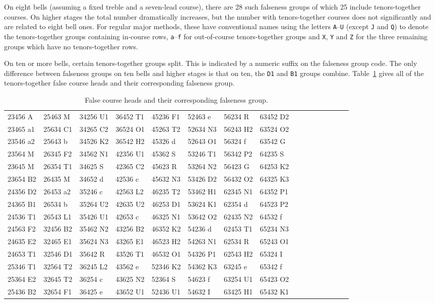 \documentclass[a4paper,11pt,oneside]{book}
\begin{document}
On eight bells (assuming a fixed treble and a seven-lead course), 
there are 28 such falseness groups of which 25 include tenors-together courses.
On higher stages the total number dramatically increases, but the number
with tenors-together courses does not significantly and are related to eight
bell ones.
For regular major methods, these have 
conventional names using the letters \verb+A+--\verb+U+ (except \verb+J+
and \verb+Q+) to denote the tenors-together groups containing in-course rows,
\verb+a+--\verb+f+ for out-of-course 
tenors-together groups and \verb+X+, \verb+Y+ and \verb+Z+ for the three 
remaining groups which have no tenors-together rows.  

On ten or more bells, certain tenors-together groups split.  This is 
indicated by a numeric suffix on the falseness group code.  The only 
difference between falseness groups on ten bells and higher stages is that 
on ten, the \verb+D1+ and \verb+B1+ groups combine.  Table~\ref{tab:fchs}
gives all of the tenors-together false course heads and their corresponding 
falseness group.

\begin{table}[h]\centering
{\tt\tiny\begin{tabular}{ll ll ll ll ll ll ll ll}
23456 A&25463 M&34256 U1&36452 T1&45236 F1&52463 e&56234 R&63452 D2\\
23465 a1&25634 C1&34265 C2&36524 O1&45263 T2&52634 N3&56243 H2&63524 O2\\
23546 a2&25643 b&34526 K2&36542 H2&45326 d&52643 O1&56324 f&63542 G\\
23564 M&26345 F2&34562 N1&42356 U1&45362 S&53246 T1&56342 P2&64235 S\\
23645 M&26354 T1&34625 S&42365 C2&45623 R&53264 N2&56423 G&64253 K2\\
23654 B2&26435 M&34652 d&42536 c&45632 N3&53426 D2&56432 O2&64325 K3\\
24356 D2&26453 a2&35246 c&42563 L2&46235 T2&53462 H1&62345 N1&64352 P1\\
24365 B1&26534 b&35264 U2&42635 U2&46253 D1&53624 K1&62354 d&64523 P2\\
24536 T1&26543 L1&35426 U1&42653 c&46325 N1&53642 O2&62435 N2&64532 f\\
24563 F2&32456 B2&35462 N2&43256 B2&46352 K2&54236 d&62453 T1&65234 N3\\
24635 E2&32465 E1&35624 N3&43265 E1&46523 H2&54263 N1&62534 R&65243 O1\\
24653 T1&32546 D1&35642 R&43526 T1&46532 O1&54326 P1&62543 H2&65324 I\\
25346 T1&32564 T2&36245 L2&43562 e&52346 K2&54362 K3&63245 e&65342 f\\
25364 E2&32645 T2&36254 c&43625 N2&52364 S&54623 f&63254 U1&65423 O2\\
25436 B2&32654 F1&36425 e&43652 U1&52436 U1&54632 I&63425 H1&65432 K1\\
\end{tabular}}
\caption{\label{tab:fchs}%
False course heads and their corresponding falseness group.}
\end{table}
\end{document}
